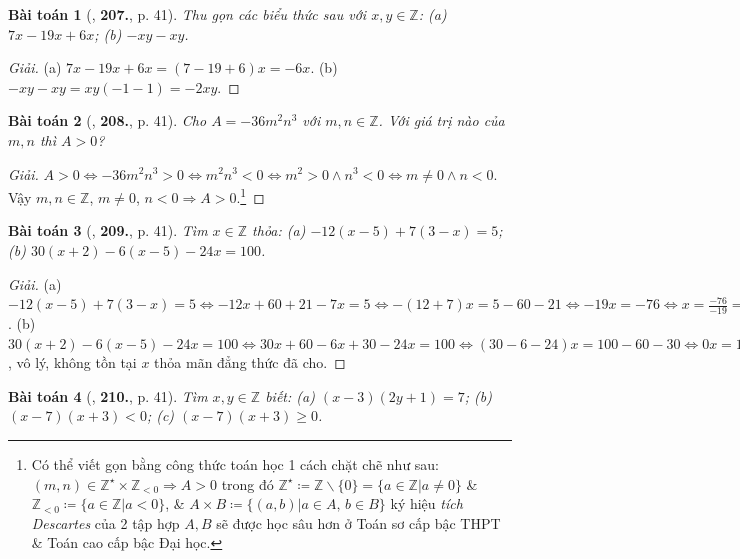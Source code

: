 \documentclass{article}
\numberwithin{equation}{section}
\newtheorem{baitoan}{Bài toán}
\begin{document}
\begin{baitoan}[\cite{Tuyen_Toan_6}, \textbf{207.}, p. 41]
	Thu gọn các biểu thức sau với $x,y\in\mathbb{Z}$: (a) $7x - 19x + 6x$; (b) $-xy - xy$.
\end{baitoan}

\begin{proof}[Giải]
	(a) $7x - 19x + 6x = (7 - 19 + 6)x = -6x$. (b) $-xy - xy = xy(-1 - 1) = -2xy$.
\end{proof}

\begin{baitoan}[\cite{Tuyen_Toan_6}, \textbf{208.}, p. 41]
	Cho $A = -36m^2n^3$ với $m,n\in\mathbb{Z}$. Với giá trị nào của $m,n$ thì $A > 0$?
\end{baitoan}

\begin{proof}[Giải]
	$A > 0\Leftrightarrow-36m^2n^3 > 0\Leftrightarrow m^2n^3 < 0\Leftrightarrow m^2 > 0\land n^3 < 0\Leftrightarrow m\ne0\land n < 0$. Vậy $m,n\in\mathbb{Z}$, $m\ne0$, $n < 0\Rightarrow A > 0$.\footnote{Có thể viết gọn bằng công thức toán học 1 cách chặt chẽ như sau: $(m,n)\in\mathbb{Z}^\star\times\mathbb{Z}_{< 0}\Rightarrow A > 0$ trong đó $\mathbb{Z}^\star\coloneqq\mathbb{Z}\backslash\{0\} = \{a\in\mathbb{Z}|a\ne 0\}$ \& $\mathbb{Z}_{< 0}\coloneqq\{a\in\mathbb{Z}|a < 0\}$, \& $A\times B\coloneqq\{(a,b)|a\in A,\,b\in B\}$ ký hiệu \textit{tích Descartes} của 2 tập hợp $A,B$ sẽ được học sâu hơn ở Toán sơ cấp bậc THPT \& Toán cao cấp bậc Đại học.} 
\end{proof}

\begin{baitoan}[\cite{Tuyen_Toan_6}, \textbf{209.}, p. 41]
	Tìm $x\in\mathbb{Z}$ thỏa: (a) $-12(x - 5) + 7(3 - x) = 5$; (b) $30(x + 2) - 6(x - 5) - 24x = 100$.
\end{baitoan}

\begin{proof}[Giải]
	(a) $-12(x - 5) + 7(3 - x) = 5\Leftrightarrow-12x + 60 + 21 - 7x = 5\Leftrightarrow-(12 + 7)x = 5 - 60 - 21\Leftrightarrow-19x = -76\Leftrightarrow x = \frac{-76}{-19} = 4$. (b) $30(x + 2) - 6(x - 5) - 24x = 100\Leftrightarrow 30x + 60 - 6x + 30 - 24x = 100\Leftrightarrow(30 - 6 - 24)x = 100 - 60 - 30\Leftrightarrow0x = 10\Leftrightarrow0 = 10$, vô lý, không tồn tại $x$ thỏa mãn đẳng thức đã cho.
\end{proof}

\begin{baitoan}[\cite{Tuyen_Toan_6}, \textbf{210.}, p. 41]
	Tìm $x,y\in\mathbb{Z}$ biết: (a) $(x - 3)(2y + 1) = 7$; (b) $(x - 7)(x + 3) < 0$; (c) $(x - 7)(x + 3)\ge0$.
\end{baitoan}
\end{document}

